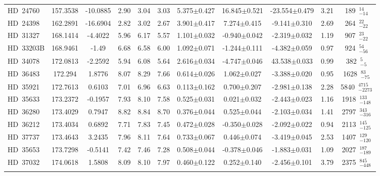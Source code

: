 {\begin{longtable}{lcccccccccc}
\noalign{\smallskip}
HD~24760 & 157.3538 & -10.0885 & 2.90 & 3.04 & 3.03 & 5.375$\pm$0.427 & 16.845$\pm$0.521 & -23.554$\pm$0.479 & 3.21 & 189~$_{-14}^{14}$ \\
\noalign{\smallskip}
HD~24398 & 162.2891 & -16.6904 & 2.82 & 3.02 & 2.67 & 3.901$\pm$0.417 & 7.274$\pm$0.415 & -9.141$\pm$0.310 & 2.69 & 264~$_{-22}^{22}$ \\
\noalign{\smallskip}
HD~31327 & 168.1414 & -4.4022 & 5.96 & 6.17 & 5.57 & 1.101$\pm$0.032 & -0.940$\pm$0.042 & -2.319$\pm$0.032 & 1.19 & 907~$_{-22}^{23}$ \\
\noalign{\smallskip}
HD~33203B & 168.9461 & -1.49 & 6.68 & 6.58 & 6.00 & 1.092$\pm$0.071 & -1.244$\pm$0.111 & -4.382$\pm$0.059 & 0.97 & 924~$_{-56}^{54}$ \\
\noalign{\smallskip}
HD~34078 & 172.0813 & -2.2592 & 5.94 & 6.08 & 5.64 & 2.616$\pm$0.034 & -4.747$\pm$0.046 & 43.538$\pm$0.033 & 0.99 & 382~$_{-5}^{5}$ \\
\noalign{\smallskip}
HD~36483 & 172.294 & 1.8776 & 8.07 & 8.29 & 7.66 & 0.614$\pm$0.026 & 1.062$\pm$0.027 & -3.388$\pm$0.020 & 0.95 & 1628~$_{-75}^{83}$ \\
\noalign{\smallskip}
HD~35921 & 172.7613 & 0.6103 & 7.01 & 6.96 & 6.63 & 0.113$\pm$0.162 & 0.700$\pm$0.207 & -2.981$\pm$0.138 & 2.28 & 5840~$_{-2273}^{4715}$ \\
\noalign{\smallskip}
HD~35633 & 173.2372 & -0.1957 & 7.93 & 8.10 & 7.58 & 0.525$\pm$0.031 & 0.021$\pm$0.032 & -2.443$\pm$0.023 & 1.16 & 1918~$_{-148}^{133}$ \\
\noalign{\smallskip}
HD~36280 & 173.4029 & 0.7947 & 8.82 & 8.84 & 8.70 & 0.376$\pm$0.044 & 0.525$\pm$0.044 & -2.103$\pm$0.034 & 1.41 & 2797~$_{-316}^{343}$ \\
\noalign{\smallskip}
HD~36212 & 173.4034 & 0.6892 & 7.71 & 7.83 & 7.45 & 0.472$\pm$0.028 & -0.350$\pm$0.028 & -2.092$\pm$0.022 & 0.94 & 2113~$_{-125}^{145}$ \\
\noalign{\smallskip}
HD~37737 & 173.4643 & 3.2435 & 7.96 & 8.11 & 7.64 & 0.733$\pm$0.067 & 0.446$\pm$0.074 & -3.419$\pm$0.045 & 2.53 & 1407~$_{-120}^{129}$ \\
\noalign{\smallskip}
HD~35653 & 173.7298 & -0.5141 & 7.42 & 7.46 & 7.28 & 0.508$\pm$0.044 & -0.378$\pm$0.046 & -1.883$\pm$0.031 & 1.09 & 2027~$_{-189}^{187}$ \\
\noalign{\smallskip}
HD~37032 & 174.0618 & 1.5808 & 8.09 & 8.10 & 7.97 & 0.460$\pm$0.122 & 0.252$\pm$0.140 & -2.456$\pm$0.101 & 3.79 & 2375~$_{-448}^{845}$ \\
\noalign{\smallskip}

\end{longtable}}
